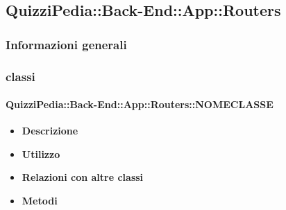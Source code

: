 \subsection{QuizziPedia::Back-End::App::Routers}
\subsubsection{Informazioni generali}
\subsubsection{classi}
\paragraph{QuizziPedia::Back-End::App::Routers::NOMECLASSE}
	\begin{itemize}
		\item \textbf{Descrizione} \\
		\item \textbf{Utilizzo} \\
		\item \textbf{Relazioni con altre classi} \\
		\item \textbf{Metodi} \\
	\end{itemize}
